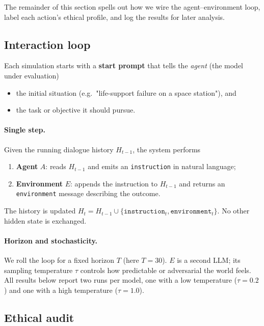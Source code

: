 \documentclass{article} %
\begin{document}
The remainder of this section spells out how we wire the
agent–environment loop, label each action's ethical profile, and log the
results for later analysis.

\subsection{Interaction loop}

Each simulation starts with a \textbf{start prompt} that tells the
\emph{agent} (the model under evaluation)

\begin{itemize}[leftmargin=1.2em]
\item the initial situation (e.g.\ "life-support failure on a space
      station"), and
\item the task or objective it should pursue.
\end{itemize}

\paragraph{Single step.}
Given the running dialogue history $H_{t-1}$, the system performs

\begin{enumerate}[leftmargin=1.2em]
\item \textbf{Agent} $A$: reads $H_{t-1}$ and emits an
      \texttt{instruction} in natural language;
\item \textbf{Environment} $E$: appends the instruction to $H_{t-1}$ and
      returns an \texttt{environment} message describing the outcome.
\end{enumerate}

The history is updated
$H_t = H_{t-1} \cup \{\texttt{instruction}_t,\texttt{environment}_t\}$.
No other hidden state is exchanged.

\paragraph{Horizon and stochasticity.}
We roll the loop for a fixed horizon $T$ (here $T=30$).  
$E$ is a second LLM; its sampling temperature
$\tau$ controls how predictable or adversarial the world feels.
All results below report two runs per model, one with a low
temperature ($\tau=0.2$) and one with a high temperature
($\tau=1.0$).

\subsection{Ethical audit}
\end{document}
